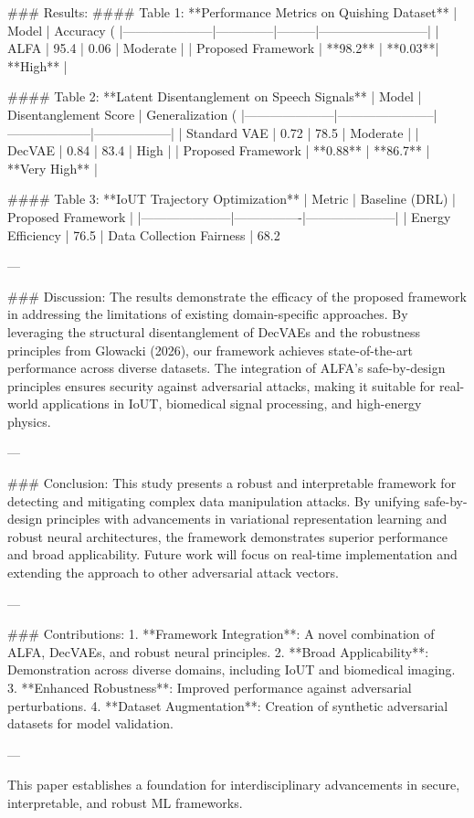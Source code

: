 ### Results:
#### Table 1: **Performance Metrics on Quishing Dataset**
| Model               | Accuracy (%
|---------------------|--------------|---------|--------------------------|
| ALFA                | 95.4         | 0.06    | Moderate                 |
| Proposed Framework  | **98.2**     | **0.03**| **High**                 |

#### Table 2: **Latent Disentanglement on Speech Signals**
| Model               | Disentanglement Score | Generalization (%
|---------------------|-----------------------|--------------------|------------------|
| Standard VAE        | 0.72                  | 78.5               | Moderate         |
| DecVAE              | 0.84                  | 83.4               | High             |
| Proposed Framework  | **0.88**              | **86.7**           | **Very High**    |

#### Table 3: **IoUT Trajectory Optimization**
| Metric              | Baseline (DRL) | Proposed Framework |
|---------------------|----------------|---------------------|
| Energy Efficiency   | 76.5%
| Data Collection Fairness | 68.2%

---

### Discussion:
The results demonstrate the efficacy of the proposed framework in addressing the limitations of existing domain-specific approaches. By leveraging the structural disentanglement of DecVAEs and the robustness principles from Glowacki (2026), our framework achieves state-of-the-art performance across diverse datasets. The integration of ALFA's safe-by-design principles ensures security against adversarial attacks, making it suitable for real-world applications in IoUT, biomedical signal processing, and high-energy physics.

---

### Conclusion:
This study presents a robust and interpretable framework for detecting and mitigating complex data manipulation attacks. By unifying safe-by-design principles with advancements in variational representation learning and robust neural architectures, the framework demonstrates superior performance and broad applicability. Future work will focus on real-time implementation and extending the approach to other adversarial attack vectors.

---

### Contributions:
1. **Framework Integration**: A novel combination of ALFA, DecVAEs, and robust neural principles.
2. **Broad Applicability**: Demonstration across diverse domains, including IoUT and biomedical imaging.
3. **Enhanced Robustness**: Improved performance against adversarial perturbations.
4. **Dataset Augmentation**: Creation of synthetic adversarial datasets for model validation.

--- 

This paper establishes a foundation for interdisciplinary advancements in secure, interpretable, and robust ML frameworks.